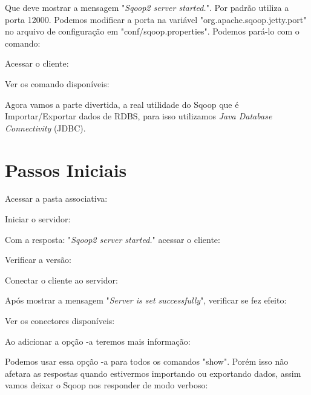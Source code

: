 \documentclass[a4paper,11pt]{article}
\begin{document}
Que deve mostrar a mensagem "\textit{Sqoop2 server started.}". Por padrão utiliza a porta 12000. Podemos modificar a porta na variável "org.apache.sqoop.jetty.port" no arquivo de configuração em "conf/sqoop.properties". Podemos pará-lo com o comando: \\

Acessar o cliente: \\

Ver os comando disponíveis: \\

Agora vamos a parte divertida, a real utilidade do Sqoop que é Importar/Exportar dados de RDBS, para isso utilizamos \textit{Java Database Connectivity} (JDBC).

\section{Passos Iniciais}
Acessar a pasta associativa: \\

Iniciar o servidor: \\

Com a resposta: "\textit{Sqoop2 server started.}" acessar o cliente: \\

Verificar a versão: \\

Conectar o cliente ao servidor: \\

Após mostrar a mensagem "\textit{Server is set successfully}", verificar se fez efeito: \\

Ver os conectores disponíveis: \\

Ao adicionar a opção -a teremos mais informação: \\

Podemos usar essa opção -a para todos os comandos "show". Porém isso não afetara as respostas quando estivermos importando ou exportando dados, assim vamos deixar o Sqoop nos responder de modo verboso: \\
\end{document}
